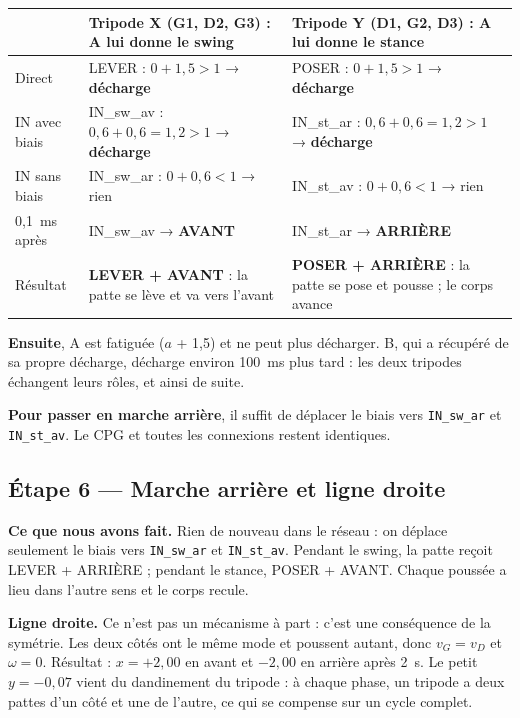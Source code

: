 \documentclass[11pt]{article}
\newcommand{\champ}[2]{\par\noindent\textbf{\color{bleu}#1} #2\par}
\newcommand{\code}[1]{\texttt{#1}}
\begin{document}
\begin{center}
\small
\begin{tabularx}{\linewidth}{l X X}
  \toprule
  & \textbf{\color{bleu}Tripode X (G1, D2, G3)} : A lui donne le swing
  & \textbf{\color{orange}Tripode Y (D1, G2, D3)} : A lui donne le stance\\ \midrule
  Direct        & LEVER : $0 + 1{,}5 > 1$ → \textbf{décharge} & POSER : $0 + 1{,}5 > 1$ → \textbf{décharge}\\
  IN avec biais & IN\_sw\_av : $0{,}6 + 0{,}6 = 1{,}2 > 1$ → \textbf{décharge} & IN\_st\_ar : $0{,}6 + 0{,}6 = 1{,}2 > 1$ → \textbf{décharge}\\
  IN sans biais & IN\_sw\_ar : $0 + 0{,}6 < 1$ → rien & IN\_st\_av : $0 + 0{,}6 < 1$ → rien\\
  0,1~ms après  & IN\_sw\_av → \textbf{AVANT} & IN\_st\_ar → \textbf{ARRIÈRE}\\ \midrule
  Résultat      & \textbf{LEVER + AVANT} : la patte se lève et va vers l'avant
                & \textbf{POSER + ARRIÈRE} : la patte se pose et pousse ; le corps avance\\ \bottomrule
\end{tabularx}
\end{center}

\textbf{Ensuite}, A est fatiguée ($a$ + 1,5) et ne peut plus décharger. B, qui a récupéré de sa
propre décharge, décharge environ 100~ms plus tard : les deux tripodes échangent leurs rôles, et
ainsi de suite.

\textbf{Pour passer en marche arrière}, il suffit de déplacer le biais vers \code{IN\_sw\_ar} et
\code{IN\_st\_av}. Le CPG et toutes les connexions restent identiques.

\subsection*{Étape 6 --- Marche arrière et ligne droite}

\champ{Ce que nous avons fait.}{Rien de nouveau dans le réseau : on déplace seulement le biais vers
\code{IN\_sw\_ar} et \code{IN\_st\_av}. Pendant le swing, la patte reçoit LEVER + ARRIÈRE ; pendant
le stance, POSER + AVANT. Chaque poussée a lieu dans l'autre sens et le corps recule.}
\champ{Ligne droite.}{Ce n'est pas un mécanisme à part : c'est une conséquence de la symétrie. Les
deux côtés ont le même mode et poussent autant, donc $v_G = v_D$ et $\omega = 0$. Résultat :
$x = +2{,}00$ en avant et $-2{,}00$ en arrière après 2~s. Le petit $y = -0{,}07$ vient du
dandinement du tripode : à chaque phase, un tripode a deux pattes d'un côté et une de l'autre, ce
qui se compense sur un cycle complet.}
\end{document}
